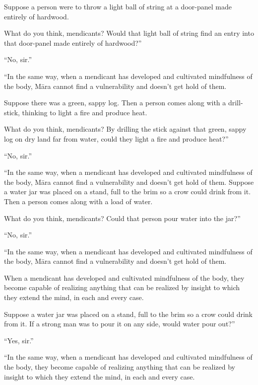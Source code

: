 \documentclass[12pt,openany]{book}%
\begin{document}
Suppose a person were to throw a light ball of string at a door-panel made entirely of hardwood. 

What do you think, mendicants? Would that light ball of string find an entry into that door-panel made entirely of hardwood?” 

“No, sir.” 

“In the same way, when a mendicant has developed and cultivated mindfulness of the body, \textsanskrit{Māra} cannot find a vulnerability and doesn’t get hold of them. 

Suppose there was a green, sappy log. Then a person comes along with a drill-stick, thinking to light a fire and produce heat. 

What do you think, mendicants? By drilling the stick against that green, sappy log on dry land far from water, could they light a fire and produce heat?” 

“No, sir.” 

“In the same way, when a mendicant has developed and cultivated mindfulness of the body, \textsanskrit{Māra} cannot find a vulnerability and doesn’t get hold of them. Suppose a water jar was placed on a stand, full to the brim so a crow could drink from it. Then a person comes along with a load of water. 

What do you think, mendicants? Could that person pour water into the jar?” 

“No, sir.” 

“In the same way, when a mendicant has developed and cultivated mindfulness of the body, \textsanskrit{Māra} cannot find a vulnerability and doesn’t get hold of them. 

When a mendicant has developed and cultivated mindfulness of the body, they become capable of realizing anything that can be realized by insight to which they extend the mind, in each and every case. 

Suppose a water jar was placed on a stand, full to the brim so a crow could drink from it. If a strong man was to pour it on any side, would water pour out?” 

“Yes, sir.” 

“In the same way, when a mendicant has developed and cultivated mindfulness of the body, they become capable of realizing anything that can be realized by insight to which they extend the mind, in each and every case. 
\end{document}
